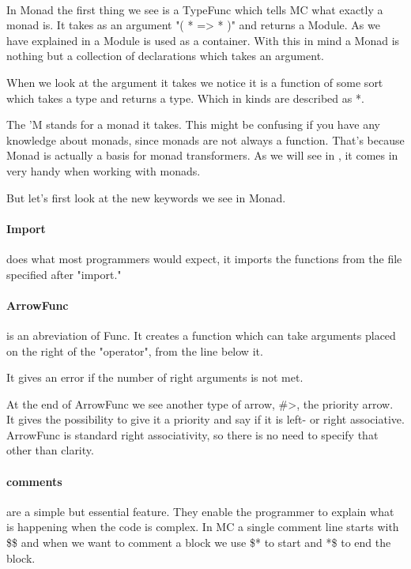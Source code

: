 \paragraph{}
In Monad the first thing we see is a TypeFunc which tells MC what exactly a monad is.
It takes as an argument "( * => * )" and returns a Module.
As we have explained in \cite{sectionstuff} a Module is used as a container.
With this in mind a Monad is nothing but a collection of declarations which takes an argument.

When we look at the argument it takes we notice it is a function of some sort which takes a type and returns a type.
Which in kinds are described as *.

The 'M stands for a monad it takes.
This might be confusing if you have any knowledge about monads, since monads are not always a function.
That's because Monad is actually a basis for monad transformers.
As we will see in \cite{sectionstuff}, it comes in very handy when working with monads.

But let's first look at the new keywords we see in Monad.

\paragraph{Import} does what most programmers would expect, it imports the functions from the file specified after "import."

\paragraph{ArrowFunc} is an abreviation of Func.
It creates a function which can take arguments placed on the right of the "operator", from the line below it.

It gives an error if the number of right arguments is not met.

At the end of ArrowFunc we see another type of arrow, \#>, the priority arrow.
It gives the possibility to give it a priority and say if it is left- or right associative.
ArrowFunc is standard right associativity, so there is no need to specify that other than clarity.

\paragraph{comments} are a simple but essential feature.
They enable the programmer to explain what is happening when the code is complex.
In MC a single comment line starts with \$\$ and when we want to comment a block we use \$* to start and *\$ to end the block.


